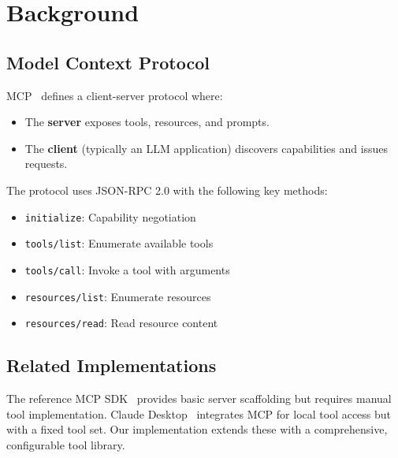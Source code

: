 \section{Background}


\subsection{Model Context Protocol}

MCP~\cite{mcp2022} defines a client-server protocol where:
\begin{itemize}
    \item The \textbf{server} exposes tools, resources, and prompts.
    \item The \textbf{client} (typically an LLM application) discovers capabilities and issues requests.
\end{itemize}

The protocol uses JSON-RPC 2.0 with the following key methods:
\begin{itemize}
    \item \texttt{initialize}: Capability negotiation
    \item \texttt{tools/list}: Enumerate available tools
    \item \texttt{tools/call}: Invoke a tool with arguments
    \item \texttt{resources/list}: Enumerate resources
    \item \texttt{resources/read}: Read resource content
\end{itemize}

\subsection{Related Implementations}

The reference MCP SDK~\cite{mcpsdk2022} provides basic server scaffolding but requires manual tool implementation. Claude Desktop~\cite{claude2023} integrates MCP for local tool access but with a fixed tool set. Our implementation extends these with a comprehensive, configurable tool library.

